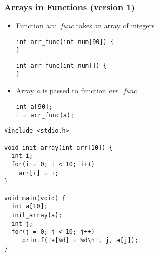 \documentclass{../c-lecture}
\begin{document}
\begin{frame}[fragile]
  \frametitle{Arrays in Functions (version 1)}
  \begin{itemize}
    \item
      Function \textit{\color{Orange} arr_func} takes an array of
      integers

    \begin{verbatim}
int arr_func(int num[90]) {
}
    \end{verbatim}
    \begin{verbatim}
int arr_func(int num[]) {
}
    \end{verbatim}
    \item
      Array \textit{\color{Orange}a} is passed to function
      \textit{\color{Orange} arr_func}

    \begin{verbatim}
int a[90];
i = arr_func(a);
    \end{verbatim}
  \end{itemize}
\end{frame}

\begin{frame}
  \begin{verbatim}
#include <stdio.h>

void init_array(int arr[10]) {
  int i;
  for(i = 0; i < 10; i++)
    arr[i] = i;
}

void main(void) {
  int a[10];
  init_array(a);
  int j;
  for(j = 0; j < 10; j++)
     printf("a[%d] = %d\n", j, a[j]);
}
  \end{verbatim}
\end{frame}
\end{document}
